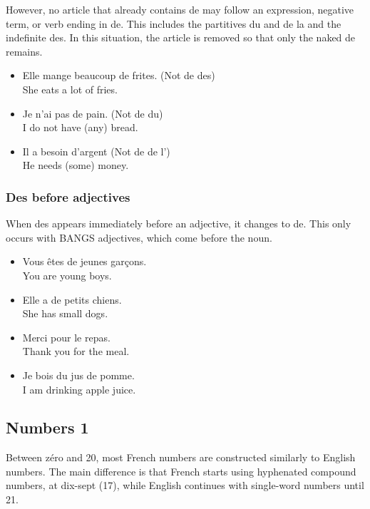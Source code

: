 However, no article that already contains de may follow an expression, negative term, or verb ending in de. This includes the partitives du and de la and the indefinite des. In this situation, the article is removed so that only the naked de remains.

\begin{itemize}
  \item  Elle mange beaucoup de frites. (Not de des) \\ She eats a lot of fries.
  \item  Je n'ai pas de pain. (Not de du) \\ I do not have (any) bread.
  \item  Il a besoin d'argent (Not de de l') \\ He needs (some) money.
\end{itemize}

\subsubsection{Des before adjectives}

When des appears immediately before an adjective, it changes to de. This only occurs with BANGS adjectives, which come before the noun.

\begin{itemize}
  \item  Vous {\^e}tes de jeunes gar{\c c}ons. \\ You are young boys.
  \item  Elle a de petits chiens. \\ She has small dogs.
\end{itemize}

\begin{itemize}
  \item  Merci pour le repas. \\ Thank you for the meal.
  \item  Je bois du jus de pomme. \\ I am drinking apple juice.
\end{itemize}


\pagebreak
\subsection{Numbers 1}

Between z{\'e}ro and 20, most French numbers are constructed similarly to English numbers. The main difference is that French starts using hyphenated compound numbers, at dix-sept (17), while English continues with single-word numbers until 21.


